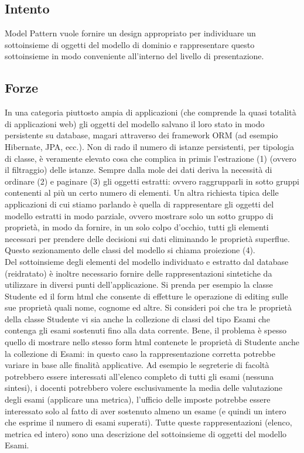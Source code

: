 \subsection{Intento}
Model Pattern vuole fornire un design appropriato per individuare un sottoinsieme di oggetti del modello di dominio e rappresentare questo sottoinsieme in modo conveniente all'interno del livello di presentazione.

\subsection{Forze}
In una categoria piuttosto ampia di applicazioni (che comprende la quasi totalità di applicazioni web)  gli oggetti del modello salvano il loro stato in modo persistente su database, magari attraverso dei framework ORM (ad esempio Hibernate, JPA, ecc.). Non di rado il numero di istanze persistenti, per tipologia di classe, è veramente elevato cosa che complica in primis l'estrazione (1) (ovvero il filtraggio) delle istanze. Sempre dalla mole dei dati deriva la necessità di ordinare (2) e paginare (3) gli oggetti estratti: ovvero raggrupparli in sotto gruppi contenenti al più un certo numero di elementi.
Un altra richiesta tipica delle applicazioni di cui stiamo parlando è quella di rappresentare gli oggetti del modello estratti in modo parziale, ovvero mostrare solo un sotto gruppo di proprietà, in modo da fornire, in un solo colpo d'occhio, tutti gli elementi necessari per prendere delle decisioni sui dati eliminando le proprietà superflue. Questo sezionamento delle classi del modello si chiama proiezione (4).\\
Del sottoinsieme degli elementi del modello individuato e estratto dal database (reidratato) è inoltre necessario fornire delle rappresentazioni sintetiche da utilizzare in diversi punti dell'applicazione. Si prenda per esempio la classe Studente ed  il form html che consente di effetture le operazione di editing sulle sue proprietà quali nome, cognome ed altre. Si consideri poi che tra le proprietà della classe Studente vi sia anche la collezione di classi del tipo Esami che contenga gli esami sostenuti fino alla data corrente. Bene, il problema è spesso quello di mostrare nello stesso form html contenete le proprietà di Studente anche la collezione di Esami: in questo caso la rappresentazione corretta potrebbe variare in base alle finalità applicative. Ad esempio le segreterie di facoltà potrebbero essere interessati all'elenco completo di tutti gli esami (nessuna sintesi), i docenti potrebbero volere esclusivamente la media delle valutazione degli esami (applicare una metrica), l'ufficio delle imposte potrebbe essere interessato solo al fatto di aver sostenuto almeno un esame (e quindi un intero che esprime il numero di esami superati). Tutte queste rappresentazioni (elenco, metrica ed intero) sono una descrizione del sottoinsieme di oggetti del modello Esami.\\
